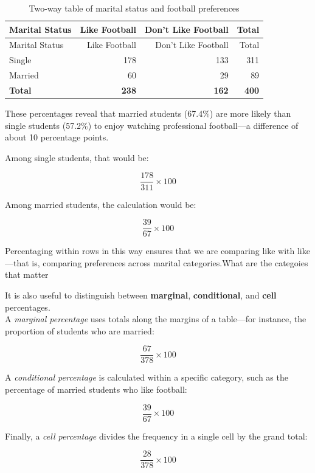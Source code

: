 \documentclass[
  letterpaper,
  DIV=11,
  numbers=noendperiod]{scrreprt}
\begin{document}
\begin{longtable}[]{@{}lrrr@{}}
\caption{Two-way table of marital status and football
preferences}\label{tbl-football}\tabularnewline
\toprule\noalign{}
Marital Status & Like Football & Don't Like Football & Total \\
\midrule\noalign{}
\endfirsthead
\toprule\noalign{}
Marital Status & Like Football & Don't Like Football & Total \\
\midrule\noalign{}
\endhead
\bottomrule\noalign{}
\endlastfoot
Single & 178 & 133 & 311 \\
Married & 60 & 29 & 89 \\
\textbf{Total} & \textbf{238} & \textbf{162} & \textbf{400} \\
\end{longtable}

These percentages reveal that married students (67.4\%) are more likely
than single students (57.2\%) to enjoy watching professional
football---a difference of about 10 percentage points.

Among single students, that would be:

\[
\frac{178}{311} \times 100
\]

Among married students, the calculation would be:

\[
\frac{39}{67} \times 100
\]

Percentaging within rows in this way ensures that we are comparing like
with like---that is, comparing preferences across marital
categories.What are the categoies that matter

It is also useful to distinguish between \textbf{marginal},
\textbf{conditional}, and \textbf{cell} percentages.\\
A \emph{marginal percentage} uses totals along the margins of a
table---for instance, the proportion of students who are married:

\[
\frac{67}{378} \times 100
\]

A \emph{conditional percentage} is calculated within a specific
category, such as the percentage of married students who like football:

\[
\frac{39}{67} \times 100
\]

Finally, a \emph{cell percentage} divides the frequency in a single cell
by the grand total:

\[
\frac{28}{378} \times 100
\]
\end{document}
